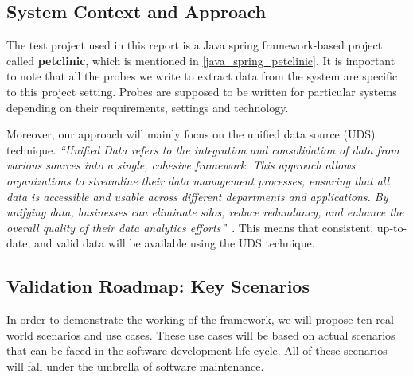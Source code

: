 \subsection{System Context and Approach}
The test project used in this report is a Java spring framework-based project called \textbf{petclinic}, which is mentioned in \autoref{java_spring_petclinic}. It is important to note that all the probes we write to extract data from the system are specific to this project setting. Probes are supposed to be written for particular systems depending on their requirements, settings and technology.

Moreover, our approach will mainly focus on the unified data source (UDS) technique. \textit{``Unified Data refers to the integration and consolidation of data from various sources into a single, cohesive framework. This approach allows organizations to streamline their data management processes, ensuring that all data is accessible and usable across different departments and applications. By unifying data, businesses can eliminate silos, reduce redundancy, and enhance the overall quality of their data analytics efforts''}~\citep{unifiedData2025}. This means that consistent, up-to-date, and valid data will be available using the UDS technique.

\subsection{Validation Roadmap: Key Scenarios}\label{ch3:validation_roadmap}

In order to demonstrate the working of the framework, we will propose ten real-world scenarios and use cases. These use cases will be based on actual scenarios that can be faced in the software development life cycle. All of these scenarios will fall under the umbrella of software maintenance.

